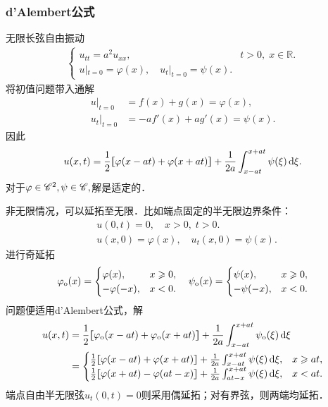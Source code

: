 \subsubsection*{d'Alembert公式}
无限长弦自由振动
\begin{align*}
	\begin{cases}
		u_{tt}=a^2u_{xx},&t>0,\;x\in\mathbb R. \\
		u|_{t=0}=\varphi(x),\quad u_t|_{t=0}=\psi(x).
	\end{cases}
\end{align*}
将初值问题带入通解
\begin{align*}
	u|_{t=0}   & =f(x)+g(x)=\varphi(x),   \\
	u_t|_{t=0} & =-af'(x)+ag'(x)=\psi(x).
\end{align*}
因此
\begin{align}
	u(x,t)=\frac12\lfloor\hspace{-4.7 pt}\lceil \varphi(x-at)+\varphi(x+at)\rceil\hspace{-4.7 pt}\rfloor+\frac1{2a}\int_{x-at}^{x+at}\psi(\xi)\mathop{}\!\mathrm{d}\xi.
\end{align}
对于$\varphi\in\mathscr C^2,\psi\in\mathscr C,$解是适定的．

非无限情况，可以延拓至无限．比如端点固定的半无限边界条件：
\begin{align*}
	 & u(0,t)=0,\quad x>0,\;t>0.                   \\
	 & u(x,0)=\varphi(x),\quad u_t(x,0)=\psi(x).
\end{align*}
进行奇延拓
\begin{align*}
	\varphi_\mathrm o(x)=
	\begin{cases}
		\varphi(x),   & x\geqslant 0, \\
		-\varphi(-x), & x<0.
	\end{cases}
	\quad
	\psi_\mathrm o(x)=
	\begin{cases}
		\psi(x),   & x\geqslant 0, \\
		-\psi(-x), & x<0.
	\end{cases}
\end{align*}
问题便适用d'Alembert公式，解
\begin{align*}
	u(x,t) & =\frac12\zkh{\varphi_\odd(x-at)+\varphi_\odd(x+at)}+\frac1{2a}\int_{x-at}^{x+at}\psi_\odd(\xi)\d\xi \\
	       & = 
	\begin{cases}
		\frac12\zkh{\varphi(x-at)+\varphi(x+at)}+\frac1{2a}\int_{x-at}^{x+at}\psi(\xi)\d\xi, & x\geqslant at, \\
		\frac12\zkh{\varphi(x+at)-\varphi(at-x)}+\frac1{2a}\int_{at-x}^{x+at}\psi(\xi)\d\xi, & x<at.
	\end{cases}
\end{align*}
端点自由半无限弦$u_t(0,t)=0$则采用偶延拓；对有界弦，则两端均延拓．


